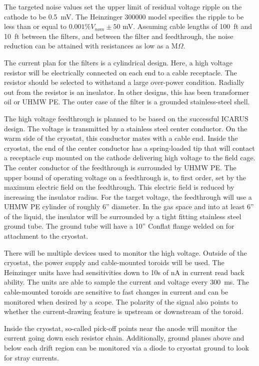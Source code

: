The targeted noise values set the upper limit of residual voltage ripple on the cathode to be \SI{0.5}{mV}.  The Heinzinger 300000 model specifies the ripple to be less than or equal to $0.001\%V_{nom} \pm 50$ mV.  Assuming cable lengths of \SI{100}{ft} and \SI{10}{ft} between the filters, and between the filter and feedthrough, the noise reduction can be attained with resistances as low as a M$\Omega$. 

The current plan for the filters is a cylindrical design.  Here, a high voltage resistor will be electrically connected on each end to a cable receptacle.  The resistor should be selected to withstand a large over-power condition.  Radially out from the resistor is an insulator.  In other designs, this has been transformer oil or UHMW PE.  The outer case of the filter is a grounded stainless-steel shell.

The high voltage feedthrough is planned to be based on the successful ICARUS design.  The voltage is transmitted by a stainless steel center conductor.  On the warm side of the cryostat, this conductor mates with a cable end.  Inside the cryostat, the end of the center conductor has a spring-loaded tip that will contact a receptacle cup mounted on the cathode delivering high voltage to the field cage.  The center conductor of the feedthrough is surrounded by UHMW PE.  The upper bound of operating voltage on a feedthrough is, to first order, set by the maximum electric field on the feedthrough.  This electric field is reduced by increasing the insulator radius.  For the target voltage, the feedthrough will use a UHMW PE cylinder of roughly 6'' diameter.  In the gas space and into at least 6'' of the liquid, the insulator will be surrounded by a tight fitting stainless steel ground tube.  The ground tube will have a 10'' Conflat flange welded on for attachment to the cryostat.

There will be multiple devices used to monitor the high voltage.  Outside of the cryostat, the power supply and cable-mounted toroids will be used.  The Heinzinger units have had sensitivities down to 10s of nA in current read back ability.  The units are able to sample the current and voltage every \SI{300}{ms}.  The cable-mounted toroids are sensitive to fast changes in current and can be monitored when desired by a scope.  The polarity of the signal also points to whether the current-drawing feature is upstream or downstream of the toroid.

Inside the cryostat, so-called pick-off points near the anode will monitor the current going down each resistor chain.  Additionally, ground planes above and below each drift region can be monitored via a diode to cryostat ground to look for stray currents.

